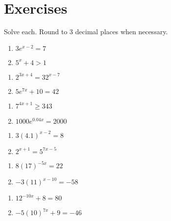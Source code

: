 \bigskip 

\section{Exercises}

Solve each. Round to 3 decimal places when necessary.
\begin{multicols}{2}
\begin{enumerate}
	\item $3e^{x-2} = 7$
	\item $5^x + 4 > 1$
\end{enumerate} \setcounter{Review}{\value{enumi}}
\end{multicols}
\begin{multicols}{2}
\begin{enumerate}	\setcounter{enumi}{\value{Review}}
	\item $2^{3x+4} = 32^{x-7}$
	\item $5e^{7x} + 10 = 42$
\end{enumerate} \setcounter{Review}{\value{enumi}}
\end{multicols}
\begin{multicols}{2}
\begin{enumerate}	\setcounter{enumi}{\value{Review}}
	\item $7^{4x+1} \geq 343$
	\item $1000e^{0.04x} = 2000$
\end{enumerate} \setcounter{Review}{\value{enumi}}
\end{multicols}
\begin{multicols}{2}
\begin{enumerate}	\setcounter{enumi}{\value{Review}}
	\item $3(4.1)^{x-2} = 8$
	\item $2^{x+1} = 5^{7x-5}$
\end{enumerate} \setcounter{Review}{\value{enumi}}
\end{multicols}
\begin{multicols}{2}
\begin{enumerate}	\setcounter{enumi}{\value{Review}}
	\item $8(17)^{-5x} = 22$
	\item $-3(11)^{x-10} = -58$
\end{enumerate} \setcounter{Review}{\value{enumi}}
\end{multicols}
\begin{multicols}{2}
\begin{enumerate}	\setcounter{enumi}{\value{Review}}
	\item $12^{-10x}+8=80$
	\item $-5(10)^{7x}+9 = -46$
\end{enumerate} \setcounter{Review}{\value{enumi}}
\end{multicols}
